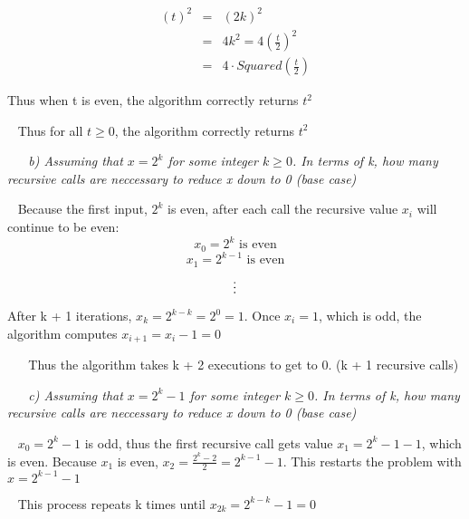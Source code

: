 \documentclass[12pt, letterpaper]{article}
\begin{document}
\begin{enumerate}
    \begin{eqnarray}
        (t)^2 &=& (2k)^2 \\
        &=& 4k^2 = 4\left(\frac{t}{2}\right)^2 \\
        &=& 4 \cdot Squared\left(\frac{t}{2}\right)
    \end{eqnarray}

    Thus when t is even, the algorithm correctly returns \(t^2\)

    \-\ \newline
    Thus for all \(t \ge 0\), the algorithm correctly returns \(t^2\)

    \-\ \newline
    \-\ \newline
    \it{ b) Assuming that \(x = 2^k\) for some integer \(k \ge 0\). In terms of k, how many recursive calls are neccessary to reduce x down to 0 (base case) }

    \-\ \newline
    \textnormal{Because the first input, \(2^k\) is even, after each call the recursive value \(x_i\) will continue to be even: }
    \[ x_0 = 2^k \text{  is even} \]
    \[ x_1 = 2^{k - 1} \text{  is even} \]
    \[ \text{\vdots} \]

    \textnormal{After k + 1 iterations, \( x_k = 2^{k - k} = 2^0 = 1 \). Once \(x_i = 1\), which is odd, the algorithm computes \(x_{i + 1} = x_{i} - 1 = 0 \)}

    \-\ \newline
    \-\ \newline
    \textnormal{Thus the algorithm takes k + 2 executions to get to 0. (k + 1 recursive calls)}


    \-\ \newline
    \-\ \newline
    \it{ c) Assuming that \(x = 2^k - 1\) for some integer \(k \ge 0\). In terms of k, how many recursive calls are neccessary to reduce x down to 0 (base case) }

    \-\ \newline
    \textnormal{ \(x_0 = 2^k - 1\) is odd, thus the first recursive call gets value \(x_1 = 2^k - 1 - 1\), which is even. Because \(x_1\) is even, \( x_2 = \frac{2^k - 2}{2} = 2^{k-1} - 1 \). This restarts the problem with \( x = 2^{k - 1} - 1  \) }

    \-\ \newline
    \textnormal{ This process repeats k times until \( x_{2k} = 2^{k - k} - 1 = 0\)}


\end{enumerate}
\end{document}
